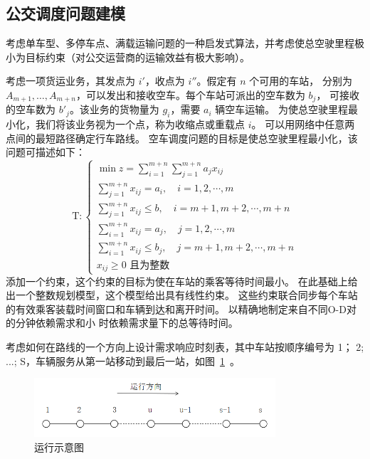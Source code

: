 \subsection{公交调度问题建模}
考虑单车型、多停车点、满载运输问题的一种启发式算法，并考虑使总空驶里程极
小为目标约束（对公交运营商的运输效益有极大影响）。

考虑一项货运业务，其发点为 $i'$，收点为 $i''$。假定有 $n$ 个可用的车站，
分别为 $A_{m+1}, \ldots, A_{m+n}$，可以发出和接收空车。每个车站可派出的空车数为 $b_j$，
可接收的空车数为 $b'_j$。该业务的货物量为 $g_i$，需要 $a_i$ 辆空车运输。
为使总空驶里程最小化，我们将该业务视为一个点，称为收缩点或重载点 $i$。
可以用网络中任意两点间的最短路径确定行车路线。
空车调度问题的目标是使总空驶里程最小化，该问题可描述如下：
$$
\mathrm{T}:
\begin{cases}
    \min z=\sum_{i=1}^{m+n} \sum_{j=1}^{m+n} a_{j} x_{i j}\\
    \sum_{j=1}^{m+n} x_{i j}=a_{i}, \quad i=1,2, \cdots, m \\
    \sum_{j=1}^{m+n} x_{i j} \leqslant b, \quad i=m+1, m+2, \cdots, m+n \\
    \sum_{i=1}^{m+n} x_{i j}=a_{j}, \quad j=1,2, \cdots, m \\
    \sum_{i=1}^{m+n} x_{i j} \leqslant b_{j}, \quad j=m+1, m+2, \cdots, m+n\\
    x_{i j} \geqslant 0 \text { 且为整数 }
\end{cases}
$$
添加一个约束，这个约束的目标为使在车站的乘客等待时间最小。
在此基础上给出一个整数规划模型，这个模型给出具有线性约束。
这些约束联合同步每个车站的有效乘客装载时间窗口和车辆到达和离开时间。
以精确地制定来自不同O-D对的分钟依赖需求和小
时依赖需求量下的总等待时间。

考虑如何在路线的一个方向上设计需求响应时刻表，其中车站按顺序编号为 1；
2; ...; S，车辆服务从第一站移动到最后一站，如图~\ref{fig42}~。
\\
\begin{figure}[htbp]
    \centering
    \includegraphics[width=0.8\textwidth]{figs/chap03/a.png}
    \caption{运行示意图}
    \label{fig42}
\end{figure}
\\

